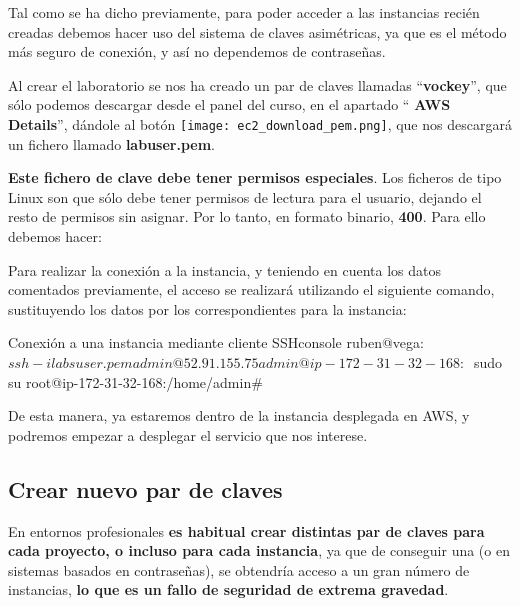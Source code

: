 Tal como se ha dicho previamente, para poder acceder a las instancias recién creadas debemos hacer uso del sistema de claves asimétricas, ya que es el método más seguro de conexión, y así no dependemos de contraseñas.

Al crear el laboratorio se nos ha creado un par de claves llamadas “\textbf{vockey}”, que sólo podemos descargar desde el panel del curso, en el apartado “\faInfo  \textbf{ AWS Details}”, dándole al botón \texttt{[image: ec2\_download\_pem.png]}, que nos descargará un fichero llamado \textbf{labuser.pem}.

\textbf{Este fichero de clave debe tener permisos especiales}. Los ficheros de tipo Linux son que sólo debe tener permisos de lectura para el usuario, dejando el resto de permisos sin asignar. Por lo tanto, en formato binario, \textbf{400}. Para ello debemos hacer:


Para realizar la conexión a la instancia, y teniendo en cuenta los datos comentados previamente, el acceso se realizará utilizando el siguiente comando, sustituyendo los datos por los correspondientes para la instancia:

\begin{mycode}{Conexión a una instancia mediante cliente SSH}{console}{}
ruben@vega:~$ ssh -i labsuser.pem admin@52.91.155.75 
admin@ip-172-31-32-168:~$ sudo su
root@ip-172-31-32-168:/home/admin#
\end{mycode}

De esta manera, ya estaremos dentro de la instancia desplegada en AWS, y podremos empezar a desplegar el servicio que nos interese.


\subsection{Crear nuevo par de claves}
En entornos profesionales \textbf{es habitual crear distintas par de claves para cada proyecto, o incluso para cada instancia}, ya que de conseguir una (o en sistemas basados en contraseñas), se obtendría acceso a un gran número de instancias, \textbf{lo que es un fallo de seguridad de extrema gravedad}.


